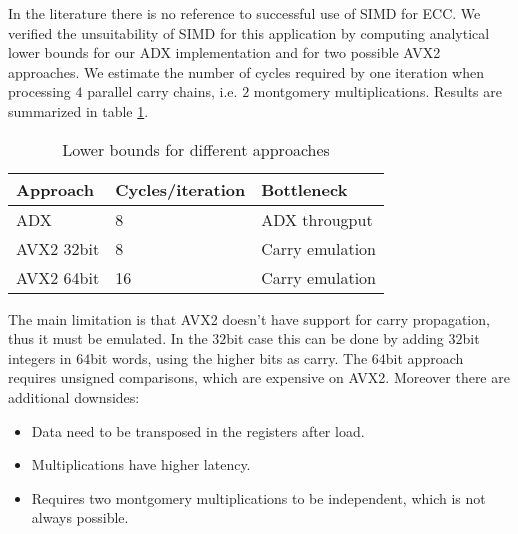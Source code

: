 In the literature there is no reference to successful use of SIMD for ECC. We verified the unsuitability of SIMD for this application by computing analytical lower bounds for our ADX implementation and for two possible AVX2 approaches.
We estimate the number of cycles required by one iteration when processing $4$ parallel carry chains, i.e. $2$ montgomery multiplications. Results are summarized in table \ref{tbl-adx-avx2}.

\begin{table}
\centering
\caption{Lower bounds for different approaches}
\label{tbl-adx-avx2}
\begin{tabular}{ l l l}
	\hline
 	Approach & Cycles/iteration & Bottleneck \\ \hline
 	ADX & 8 & ADX througput \\
  	AVX2 32bit & 8 & Carry emulation \\
 	AVX2 64bit & 16 & Carry emulation \\ \hline
\end{tabular}
\end{table}

The main limitation is that AVX2 doesn't have support for carry propagation, thus it must be emulated. In the $32$bit case this can be done by adding $32$bit integers in $64$bit words, using the higher bits as carry. The $64$bit approach requires unsigned comparisons, which are expensive on AVX2. Moreover there are additional downsides:
\begin{itemize}
\item Data need to be transposed in the registers after load.
\item Multiplications have higher latency.
\item Requires two montgomery multiplications to be independent, which is not always possible.
\end{itemize}
